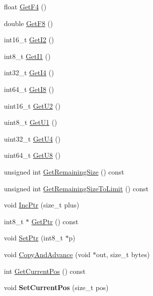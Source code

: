 \begin{DoxyCompactItemize}
\item 
float \hyperlink{singleton_assimp_1_1_stream_reader_a18b3a260ede09eb5ff17fd434a561c9b}{Get\+F4} ()
\item 
double \hyperlink{singleton_assimp_1_1_stream_reader_a5d9bec46e411692e25e7c6990cc12632}{Get\+F8} ()
\item 
int16\+\_\+t \hyperlink{singleton_assimp_1_1_stream_reader_ab05996b2c53aa1e0e972ab599923aaac}{Get\+I2} ()
\item 
int8\+\_\+t \hyperlink{singleton_assimp_1_1_stream_reader_ab348116fba75cabbb3dd88549883f09f}{Get\+I1} ()
\item 
int32\+\_\+t \hyperlink{singleton_assimp_1_1_stream_reader_a1b01096125ddbfe94d6420e35494fb19}{Get\+I4} ()
\item 
int64\+\_\+t \hyperlink{singleton_assimp_1_1_stream_reader_aea1503888f1d091cb68d7345b8639fad}{Get\+I8} ()
\item 
uint16\+\_\+t \hyperlink{singleton_assimp_1_1_stream_reader_ae64755a9b2c09770eedc43e14ce755b6}{Get\+U2} ()
\item 
uint8\+\_\+t \hyperlink{singleton_assimp_1_1_stream_reader_a50b0bd037f370571a0f2d978f9bb0fe2}{Get\+U1} ()
\item 
uint32\+\_\+t \hyperlink{singleton_assimp_1_1_stream_reader_a7275f6d13d5018eacd766af6cf195689}{Get\+U4} ()
\item 
uint64\+\_\+t \hyperlink{singleton_assimp_1_1_stream_reader_a44ed65e0c214b9622a2b064ce98b0a76}{Get\+U8} ()
\item 
unsigned int \hyperlink{singleton_assimp_1_1_stream_reader_acc0ff1334f1d0a2089dfb43b26666c57}{Get\+Remaining\+Size} () const 
\item 
unsigned int \hyperlink{singleton_assimp_1_1_stream_reader_abb783d6d18895b8cb2eeace4fbc2a776}{Get\+Remaining\+Size\+To\+Limit} () const 
\item 
void \hyperlink{singleton_assimp_1_1_stream_reader_a267a604112c1302fffd006ee24b5888f}{Inc\+Ptr} (size\+\_\+t plus)
\item 
int8\+\_\+t $\ast$ \hyperlink{singleton_assimp_1_1_stream_reader_a8cd616c12ab2ae9da7a890c751042c1c}{Get\+Ptr} () const 
\item 
void \hyperlink{singleton_assimp_1_1_stream_reader_a5311305e17f4a50159abede1c8ac0a1a}{Set\+Ptr} (int8\+\_\+t $\ast$p)
\item 
void \hyperlink{singleton_assimp_1_1_stream_reader_a1f2f70172ac9209ff4b460b751676f0b}{Copy\+And\+Advance} (void $\ast$out, size\+\_\+t bytes)
\item 
int \hyperlink{singleton_assimp_1_1_stream_reader_a1e92d17c24fbd2cf7000bbaee1a729c2}{Get\+Current\+Pos} () const 
\item 
\hypertarget{singleton_assimp_1_1_stream_reader_a9a9b3117562c26c9cc4f8b4c1b9f2a06}{void {\bfseries Set\+Current\+Pos} (size\+\_\+t pos)}\label{singleton_assimp_1_1_stream_reader_a9a9b3117562c26c9cc4f8b4c1b9f2a06}


\end{DoxyCompactItemize}
